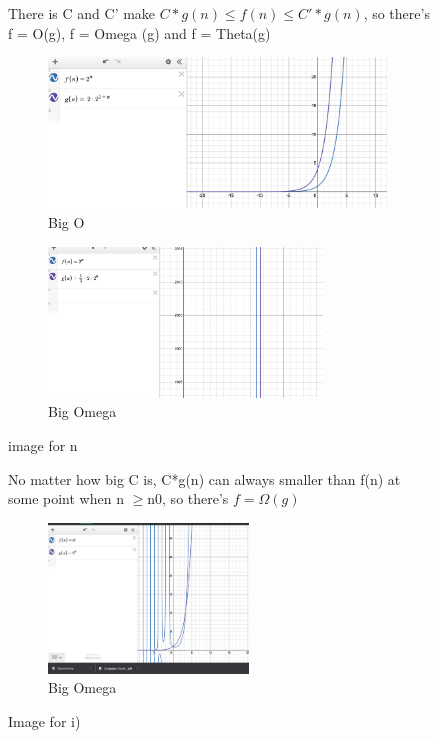 \documentclass{article}
\begin{document}
\begin{enumerate}[label=(\alph*)]
\begin{figure}[h]  
\item %
There is C and C' make $C*g(n) \le f(n) \le C'*g(n)$, so  there's f = O(g), f = Omega (g) and f = Theta(g)\\
    \begin{subfigure}{0.5\textwidth}
    \includegraphics[width=0.9\linewidth, height=4cm]{n big O.png}
    \caption{Big O}
    \label{fig:subim1}
    \end{subfigure}
    \begin{subfigure}{0.5\textwidth}
    \includegraphics[width=0.9\linewidth, height=4cm]{n big omega.png}
    \caption{Big Omega}
    \label{fig:subim2}
    \end{subfigure}
    \caption{image for n}
    \label{fig:image2}
    \end{figure}
    
\begin{figure}[h]
\item %
No matter how big C is, C*g(n) can always smaller than f(n) at some point when n $\ge $n0, so there's $f = \Omega(g)$\\
    \begin{subfigure}{0.5\textwidth}
    \includegraphics[width=0.9\linewidth, height=4cm]{o big omega.png}
    \caption{Big Omega}
    \label{fig:subim1}
    \end{subfigure}
    \caption{Image for i)}
    \label{fig:image2}
    \end{figure}
    

\end{enumerate}
\end{document}
